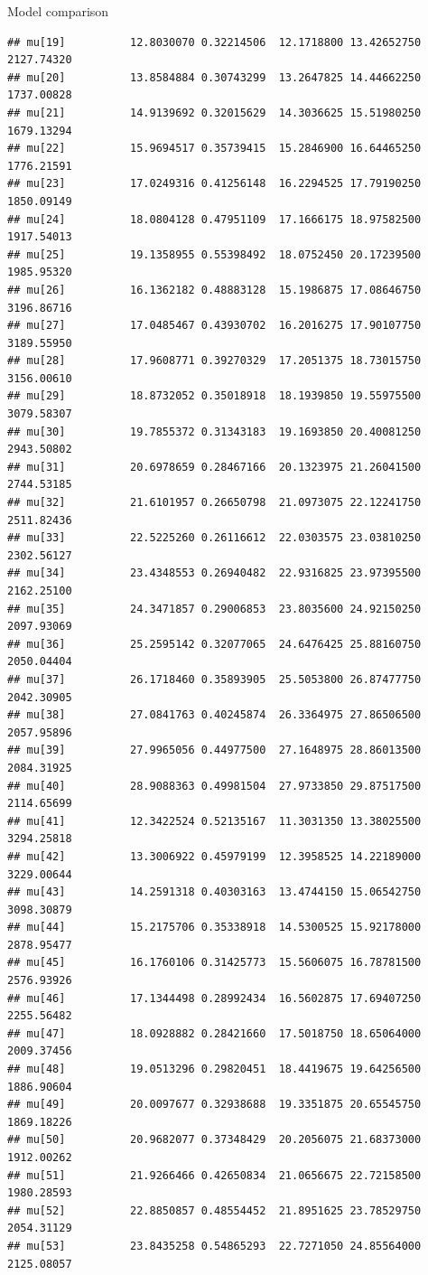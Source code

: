 \documentclass[
  ignorenonframetext,
]{beamer}
\begin{document}
\begin{frame}[fragile]{Model comparison}
\begin{verbatim}
## mu[19]          12.8030070 0.32214506  12.1718800 13.42652750 2127.74320
## mu[20]          13.8584884 0.30743299  13.2647825 14.44662250 1737.00828
## mu[21]          14.9139692 0.32015629  14.3036625 15.51980250 1679.13294
## mu[22]          15.9694517 0.35739415  15.2846900 16.64465250 1776.21591
## mu[23]          17.0249316 0.41256148  16.2294525 17.79190250 1850.09149
## mu[24]          18.0804128 0.47951109  17.1666175 18.97582500 1917.54013
## mu[25]          19.1358955 0.55398492  18.0752450 20.17239500 1985.95320
## mu[26]          16.1362182 0.48883128  15.1986875 17.08646750 3196.86716
## mu[27]          17.0485467 0.43930702  16.2016275 17.90107750 3189.55950
## mu[28]          17.9608771 0.39270329  17.2051375 18.73015750 3156.00610
## mu[29]          18.8732052 0.35018918  18.1939850 19.55975500 3079.58307
## mu[30]          19.7855372 0.31343183  19.1693850 20.40081250 2943.50802
## mu[31]          20.6978659 0.28467166  20.1323975 21.26041500 2744.53185
## mu[32]          21.6101957 0.26650798  21.0973075 22.12241750 2511.82436
## mu[33]          22.5225260 0.26116612  22.0303575 23.03810250 2302.56127
## mu[34]          23.4348553 0.26940482  22.9316825 23.97395500 2162.25100
## mu[35]          24.3471857 0.29006853  23.8035600 24.92150250 2097.93069
## mu[36]          25.2595142 0.32077065  24.6476425 25.88160750 2050.04404
## mu[37]          26.1718460 0.35893905  25.5053800 26.87477750 2042.30905
## mu[38]          27.0841763 0.40245874  26.3364975 27.86506500 2057.95896
## mu[39]          27.9965056 0.44977500  27.1648975 28.86013500 2084.31925
## mu[40]          28.9088363 0.49981504  27.9733850 29.87517500 2114.65699
## mu[41]          12.3422524 0.52135167  11.3031350 13.38025500 3294.25818
## mu[42]          13.3006922 0.45979199  12.3958525 14.22189000 3229.00644
## mu[43]          14.2591318 0.40303163  13.4744150 15.06542750 3098.30879
## mu[44]          15.2175706 0.35338918  14.5300525 15.92178000 2878.95477
## mu[45]          16.1760106 0.31425773  15.5606075 16.78781500 2576.93926
## mu[46]          17.1344498 0.28992434  16.5602875 17.69407250 2255.56482
## mu[47]          18.0928882 0.28421660  17.5018750 18.65064000 2009.37456
## mu[48]          19.0513296 0.29820451  18.4419675 19.64256500 1886.90604
## mu[49]          20.0097677 0.32938688  19.3351875 20.65545750 1869.18226
## mu[50]          20.9682077 0.37348429  20.2056075 21.68373000 1912.00262
## mu[51]          21.9266466 0.42650834  21.0656675 22.72158500 1980.28593
## mu[52]          22.8850857 0.48554452  21.8951625 23.78529750 2054.31129
## mu[53]          23.8435258 0.54865293  22.7271050 24.85564000 2125.08057

\end{verbatim}
\end{frame}
\end{document}
